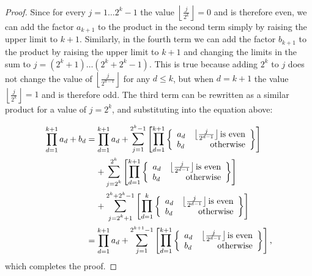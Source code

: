 \documentclass[11pt,a4paper]{tesis}
\theoremstyle{plain}
\theoremstyle{definition}
\begin{document}
\begin{proof}
  Since for every $j = 1 \dots 2^{k} - 1$ the value $\left\lfloor \frac{j}{2^{k}} \right\rfloor = 0$ and is therefore even, we can add the factor $a_{k + 1}$ to the product in the second term simply by raising the upper limit to $k + 1$. Similarly, in the fourth term we can add the factor $b_{k + 1}$ to the product by raising the upper limit to $k + 1$ and changing the limits in the sum to $j = (2^k + 1) \dots (2^k + 2^k - 1)$. This is true because adding $2^k$ to $j$ does not change the value of $\left\lfloor \frac{j}{2^{d - 1}} \right\rfloor$ for any $d \le k$, but when $d = k + 1$ the value $\left\lfloor \frac{j}{2^{k}} \right\rfloor = 1$ and is therefore odd. The third term can be rewritten as a similar product for a value of $j = 2^k$, and substituting into the equation above:

  \begin{equation*}
    \begin{aligned}
      \prod_{d = 1}^{k + 1} a_d + b_d
        & = \prod_{d = 1}^{k + 1} a_d + \mathlarger{\sum}_{j = 1}^{2^k - 1} \left [ \mathlarger{\prod}_{d = 1}^{k + 1}
        \left \{ \begin{array}{lr}
          a_d & \left\lfloor \frac{j}{2^{d - 1}} \right\rfloor \text{is even} \\
          b_d & \text{otherwise}
        \end{array} \right \} \right ] \\
        & \hspace*{4mm} + \mathlarger{\sum}_{j = 2^k}^{2^k} \left [ \mathlarger{\prod}_{d = 1}^{k + 1}
        \left \{ \begin{array}{lr}
          a_d & \left\lfloor \frac{j}{2^{d - 1}} \right\rfloor \text{is even} \\
          b_d & \text{otherwise}
        \end{array} \right \} \right ] \\
        & \hspace*{4mm} + \mathlarger{\sum}_{j = 2^k + 1}^{2^k + 2^k - 1} \left [ \mathlarger{\prod}_{d = 1}^{k}
        \left \{ \begin{array}{lr}
          a_d & \left\lfloor \frac{j}{2^{d - 1}} \right\rfloor \text{is even} \\
          b_d & \text{otherwise}
        \end{array} \right \} \right ] \\
        & = \prod_{d = 1}^{k + 1} a_d + \mathlarger{\sum}_{j = 1}^{2^{k + 1} - 1} \left [ \mathlarger{\prod}_{d = 1}^{k + 1}
        \left \{ \begin{array}{lr}
          a_d & \left\lfloor \frac{j}{2^{d - 1}} \right\rfloor \text{is even} \\
          b_d & \text{otherwise}
        \end{array} \right \} \right ] \text{,}
    \end{aligned}
  \end{equation*}
  which completes the proof.

\end{proof}
\end{document}
